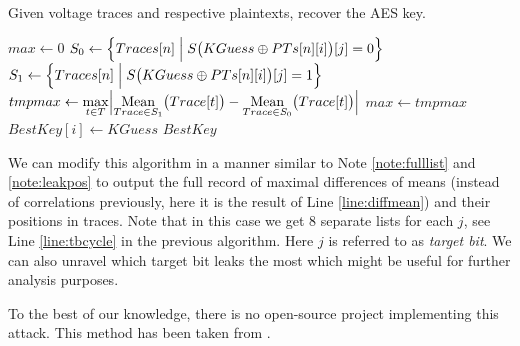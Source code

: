 	\begin{alg}
	\label{alg:bitwisedpa}
	Given voltage traces and respective plaintexts, recover the AES key.
		\begin{algorithmic}[1]
					\State $max \gets 0$
						\label{line:tbcycle}
							\State $S_0 \gets \Bigl\{ Traces[n] \Bigm| S\bigl(KGuess\oplus PTs[n][i]\bigr)[j] = 0 \Bigr\}$ \label{line:s0}
							\State $S_1 \gets \Bigl\{ Traces[n] \Bigm| S\bigl(KGuess\oplus PTs[n][i]\bigr)[j] = 1 \Bigr\}$ \label{line:s1}
							\State $tmpmax \gets \max\limits_{t\in T} \Bigl| \operatorname*{Mean}\limits_{Trace\in S_1}\bigl(Trace[t]\bigr) - \operatorname*{Mean}\limits_{Trace\in S_0}\bigl(Trace[t]\bigr) \Bigr|$
								\label{line:diffmean}
								\State $max \gets tmpmax$
								\State $BestKey[i] \gets KGuess$
							\EndIf
						\EndFor
					\EndFor
				\EndFor
				\State\Return $BestKey$
			\EndFunction
		\end{algorithmic}
	\end{alg}
	
	\begin{note}
	\label{note:eightlists}
		We can modify this algorithm in a manner similar to Note \ref{note:fulllist} and \ref{note:leakpos} to output the full record of maximal differences of means (instead of correlations previously, here it is the result of Line \ref{line:diffmean}) and their positions in traces. Note that in this case we get $8$ separate lists for each $j$, see Line \ref{line:tbcycle} in the previous algorithm. Here $j$ is referred to as {\em target bit}. We can also unravel which target bit leaks the most which might be useful for further analysis purposes.
	\end{note}
	
	To the best of our knowledge, there is no open-source project implementing this attack. This method has been taken from \cite{teuwen2015movfuscator}.

